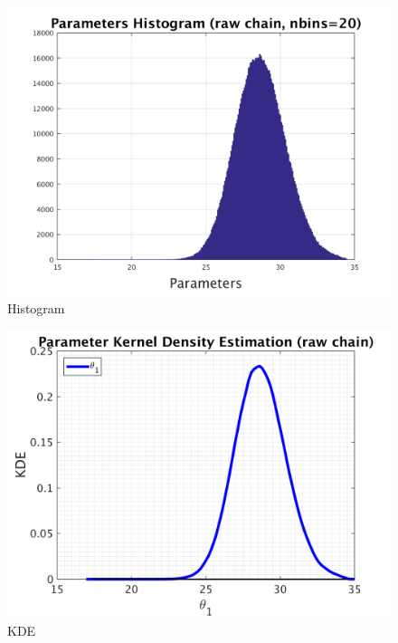 \begin{figure}[H]
  
  \centering
   \includegraphics[scale=0.75]{53_results/output_1000000/simple_ip_hist_raw}
   \caption{Histogram}
\end{figure}



\begin{figure}[H]
  
  \centering
   \includegraphics[scale=0.75]{53_results/output_1000000/simple_ip_kde_raw}
   \caption{ KDE }
\end{figure}

